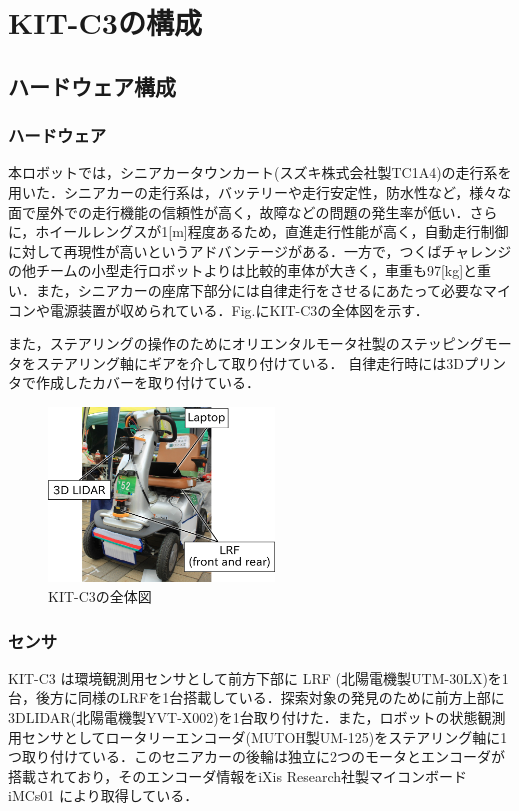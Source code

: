 \documentclass[10pt,a4paper]{jarticle}
\begin{document}
\section{KIT-C3の構成}
\subsection{ハードウェア構成}
\subsubsection{ハードウェア}
本ロボットでは，シニアカータウンカート(スズキ株式会社製TC1A4)の走行系を用いた．シニアカーの走行系は，バッテリーや走行安定性，防水性など，様々な面で屋外での走行機能の信頼性が高く，故障などの問題の発生率が低い．さらに，ホイールレングスが1[m]程度あるため，直進走行性能が高く，自動走行制御に対して再現性が高いというアドバンテージがある．一方で，つくばチャレンジの他チームの小型走行ロボットよりは比較的車体が大きく，車重も97[kg]と重い．また，シニアカーの座席下部分には自律走行をさせるにあたって必要なマイコンや電源装置が収められている．Fig.にKIT-C3の全体図を示す．

また，ステアリングの操作のためにオリエンタルモータ社製のステッピングモータをステアリング軸にギアを介して取り付けている．
自律走行時には3Dプリンタで作成したカバーを取り付けている．

\begin{figure}[bt]
 \centering
 \includegraphics[width=6cm]{./fig/png/thirdrobot_2016ver.png}
 \caption{KIT-C3の全体図}
\end{figure}


\subsubsection{センサ}
KIT-C3 は環境観測用センサとして前方下部に LRF (北陽電機製UTM-30LX)を1台，後方に同様のLRFを1台搭載している．探索対象の発見のために前方上部に3DLIDAR(北陽電機製YVT-X002)を1台取り付けた．また，ロボットの状態観測用センサとしてロータリーエンコーダ(MUTOH製UM-125)をステアリング軸に1つ取り付けている．このセニアカーの後輪は独立に2つのモータとエンコーダが搭載されており，そのエンコーダ情報をiXis Research社製マイコンボード iMCs01 により取得している．
\end{document}

